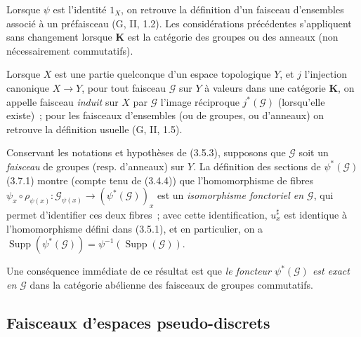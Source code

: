 \begin{env}[3.7.1]
Lorsque $\psi$ est l'identité $1_X$, on retrouve la définition d'un faisceau
d'ensembles associé à un préfaisceau (G, II, 1.2). Les considérations
précédentes s'appliquent sans changement lorsque $\boldsymbol{K}$ est la
catégorie des groupes ou des anneaux (non nécessairement commutatifs).

Lorsque $X$ est une partie quelconque d'un espace topologique $Y$, et $j$
l'injection canonique $X\to Y$, pour tout faisceau $\mathcal{G}$ sur $Y$ à
valeurs dans une catégorie $\boldsymbol{K}$, on appelle faisceau \emph{induit} sur
$X$ par $\mathcal{G}$ l'image réciproque $j^*(\mathcal{G})$ (lorsqu'elle
existe)~; pour les faisceaux d'ensembles (ou de groupes, ou d'anneaux) on
retrouve la définition usuelle (G, II, 1.5).
\end{env}

\begin{env}[3.7.2]
\label{0.3.7.2-fr}
Conservant les notations et hypothèses de (3.5.3), supposons que
$\mathcal{G}$ soit un \emph{faisceau} de groupes (resp. d'anneaux) sur $Y$.
La définition des sections de $\psi^*(\mathcal{G})$ (3.7.1) montre (compte
tenu de (3.4.4)) que l'homomorphisme de fibres
$\psi_x\circ\rho_{\psi(x)}:\mathcal{G}_{\psi(x)}\to
(\psi^*(\mathcal{G}))_x$ est un \emph{isomorphisme fonctoriel en
$\mathcal{G}$}, qui permet d'identifier ces deux fibres~; avec cette
identification, $u_x^\sharp$ est identique à l'homomorphisme défini dans
(3.5.1), et en particulier, on a
$\operatorname{Supp}(\psi^*(\mathcal{G}))=
\psi^{-1}(\operatorname{Supp}(\mathcal{G}))$.

Une conséquence immédiate de ce résultat est que \emph{le foncteur
$\psi^*(\mathcal{G})$ est exact en $\mathcal{G}$} dans la catégorie abélienne
des faisceaux de groupes commutatifs.
\end{env}


\subsection{Faisceaux d'espaces pseudo-discrets}

